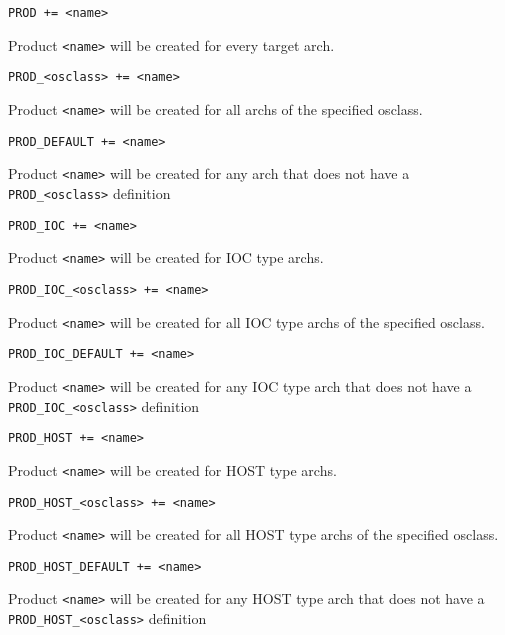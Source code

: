 \begin{description}

\item {}\verb|PROD += <name>|

Product \verb|<name>| will be created for every target arch.

\item \verb|PROD_<osclass> += <name>|

Product \verb|<name>| will be created for all archs of the specified osclass.

\item \verb|PROD_DEFAULT += <name>|

Product \verb|<name>| will be created for any arch that does not have a \verb|PROD_<osclass>| definition

\item

\item {}\verb|PROD_IOC += <name>|

Product \verb|<name>| will be created for IOC type archs.

\item \verb|PROD_IOC_<osclass> += <name>|

Product \verb|<name>| will be created for all IOC type archs of the specified osclass.

\item \verb|PROD_IOC_DEFAULT += <name>|

Product \verb|<name>| will be created for any IOC type arch that does not have a \verb|PROD_IOC_<osclass>| 
definition

\item

\item {}\verb|PROD_HOST += <name>|

Product \verb|<name>| will be created for HOST type archs.

\item \verb|PROD_HOST_<osclass> += <name>|

Product \verb|<name>| will be created for all HOST type archs of the specified osclass.

\item \verb|PROD_HOST_DEFAULT += <name>|

Product \verb|<name>| will be created for any HOST type arch that does not have a \verb|PROD_HOST_<osclass>| 
definition

\end{description}

